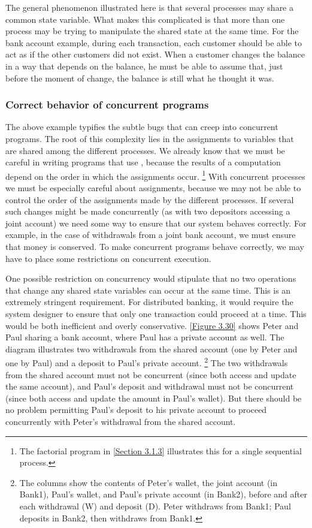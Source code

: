 The general phenomenon illustrated here is that several processes may share a common state variable.
What makes this complicated is that more than one process may be trying to manipulate the shared state at the same time.
For the bank account example, during each transaction, each customer should be able to act as if the other customers did not exist.
When a customer changes the balance in a way that depends on the balance, he must be able to assume that, just before the moment of change, the balance is still what he thought it was.



\subsubsection*{Correct behavior of concurrent programs}

The above example typifies the subtle bugs that can creep into concurrent programs.
The root of this complexity lies in the assignments to variables that are shared among the different processes.
We already know that we must be careful in writing programs that use , because the results of a computation depend on the order in which the assignments occur.%
\footnote{
	The factorial program in \cref{Section 3.1.3} illustrates this for a single sequential process.
}
With concurrent processes we must be especially careful about assignments, because we may not be able to control the order of the assignments made by the different processes.
If several such changes might be made concurrently (as with two depositors accessing a joint account) we need some way to ensure that our system behaves correctly.
For example, in the case of withdrawals from a joint bank account, we must ensure that money is conserved.
To make concurrent programs behave correctly, we may have to place some restrictions on concurrent execution.

One possible restriction on concurrency would stipulate that no two operations that change any shared state variables can occur at the same time.
This is an extremely stringent requirement.
For distributed banking, it would require the system designer to ensure that only one transaction could proceed at a time.
This would be both inefficient and overly conservative.
\cref{Figure 3.30} shows Peter and Paul sharing a bank account, where Paul has a private account as well.
The diagram illustrates two withdrawals from the shared account (one by Peter and one by Paul) and a deposit to Paul’s private account.%
\footnote{
	The columns show the contents of Peter’s wallet, the joint account (in Bank1), Paul’s wallet, and Paul’s private account (in Bank2), before and after each withdrawal (W) and deposit (D).
	Peter withdraws  from Bank1;
	Paul deposits  in Bank2, then withdraws  from Bank1.
}
The two withdrawals from the shared account must not be concurrent (since both access and update the same account), and Paul’s deposit and withdrawal must not be concurrent (since both access and update the amount in Paul’s wallet).
But there should be no problem permitting Paul’s deposit to his private account to proceed concurrently with Peter’s withdrawal from the shared account.


